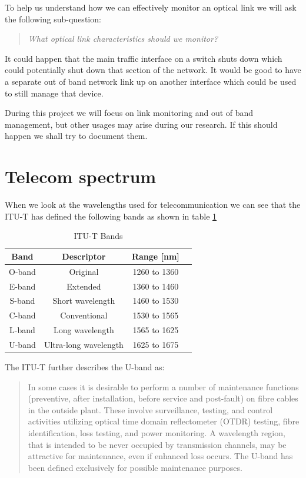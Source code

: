 \documentclass{article}
\begin{document}
To help us understand how we can effectively monitor an optical link we will ask the following sub-question:
\begin{quote}
\textit{
What optical link characteristics should we monitor?
}
\end{quote}

It could happen that the main traffic interface on a switch shuts down which could potentially shut down that section of the network.
It would be good to have a separate out of band network link up on another interface which could be used to still manage that device.

During this project we will focus on link monitoring and out of band management, but other usages may arise during our research.
If this should happen we shall try to document them.

\newpage
\section{Telecom spectrum}
When we look at the wavelengths used for telecommunication we can see that the ITU-T has defined the following bands as shown in table \ref{tab:bands}
\begin{table}[h]
\centering
\label{tab:bands}
\begin{tabular}{|c|c|c|c|}
\hline 
\textbf{Band} & \textbf{Descriptor} & \textbf{Range [nm]}\\ 
\hline 
O-band & Original & 1260 to 1360 \\ 
\hline 
E-band & Extended & 1360 to 1460 \\ 
\hline 
S-band & Short wavelength & 1460 to 1530 \\ 
\hline 
C-band & Conventional & 1530 to 1565 \\ 
\hline 
L-band & Long wavelength & 1565 to 1625 \\ 
\hline 
U-band & Ultra-long wavelength & 1625 to 1675 \\ 
\hline 
\end{tabular} 
\caption{ITU-T Bands\cite[p. 134]{itu-t:manual2009}
}
\end{table}

The ITU-T further describes the U-band as:
\begin{quote}
In some cases it is desirable to perform a number of maintenance functions (preventive, after
installation, before service and post-fault) on fibre cables in the outside plant. These involve
surveillance, testing, and control activities utilizing optical time domain reflectometer (OTDR)
testing, fibre identification, loss testing, and power monitoring. A wavelength region, that is
intended to be never occupied by transmission channels, may be attractive for maintenance,
even if enhanced loss occurs. The U-band has been defined exclusively for possible
maintenance purposes.
\end{quote}
\end{document}
